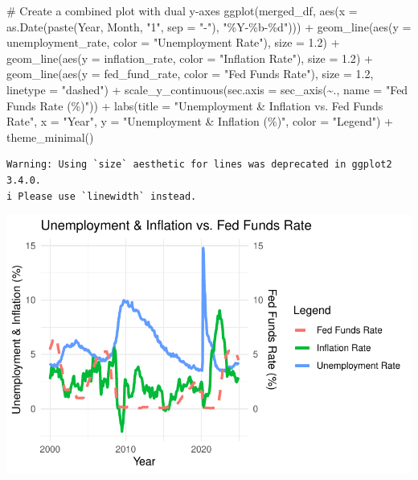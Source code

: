 \documentclass[
  letterpaper,
  DIV=11,
  numbers=noendperiod]{scrartcl}
\newenvironment{Shaded}{\begin{snugshade}}{\end{snugshade}}
\newcommand{\AttributeTok}[1]{\textcolor[rgb]{0.40,0.45,0.13}{#1}}
\newcommand{\CommentTok}[1]{\textcolor[rgb]{0.37,0.37,0.37}{#1}}
\newcommand{\FloatTok}[1]{\textcolor[rgb]{0.68,0.00,0.00}{#1}}
\newcommand{\FunctionTok}[1]{\textcolor[rgb]{0.28,0.35,0.67}{#1}}
\newcommand{\NormalTok}[1]{\textcolor[rgb]{0.00,0.23,0.31}{#1}}
\newcommand{\SpecialCharTok}[1]{\textcolor[rgb]{0.37,0.37,0.37}{#1}}
\newcommand{\StringTok}[1]{\textcolor[rgb]{0.13,0.47,0.30}{#1}}
\begin{document}
\begin{Shaded}
\begin{Highlighting}[]
\CommentTok{\# Create a combined plot with dual y{-}axes}
\FunctionTok{ggplot}\NormalTok{(merged\_df, }\FunctionTok{aes}\NormalTok{(}\AttributeTok{x =} \FunctionTok{as.Date}\NormalTok{(}\FunctionTok{paste}\NormalTok{(Year, Month, }\StringTok{"1"}\NormalTok{, }\AttributeTok{sep =} \StringTok{"{-}"}\NormalTok{), }\StringTok{"\%Y{-}\%b{-}\%d"}\NormalTok{))) }\SpecialCharTok{+}
  \FunctionTok{geom\_line}\NormalTok{(}\FunctionTok{aes}\NormalTok{(}\AttributeTok{y =}\NormalTok{ unemployment\_rate, }\AttributeTok{color =} \StringTok{"Unemployment Rate"}\NormalTok{), }\AttributeTok{size =} \FloatTok{1.2}\NormalTok{) }\SpecialCharTok{+}
  \FunctionTok{geom\_line}\NormalTok{(}\FunctionTok{aes}\NormalTok{(}\AttributeTok{y =}\NormalTok{ inflation\_rate, }\AttributeTok{color =} \StringTok{"Inflation Rate"}\NormalTok{), }\AttributeTok{size =} \FloatTok{1.2}\NormalTok{) }\SpecialCharTok{+}
  \FunctionTok{geom\_line}\NormalTok{(}\FunctionTok{aes}\NormalTok{(}\AttributeTok{y =}\NormalTok{ fed\_fund\_rate, }\AttributeTok{color =} \StringTok{"Fed Funds Rate"}\NormalTok{), }\AttributeTok{size =} \FloatTok{1.2}\NormalTok{, }\AttributeTok{linetype =} \StringTok{"dashed"}\NormalTok{) }\SpecialCharTok{+}
  \FunctionTok{scale\_y\_continuous}\NormalTok{(}\AttributeTok{sec.axis =} \FunctionTok{sec\_axis}\NormalTok{(}\SpecialCharTok{\textasciitilde{}}\NormalTok{., }\AttributeTok{name =} \StringTok{"Fed Funds Rate (\%)"}\NormalTok{)) }\SpecialCharTok{+}
  \FunctionTok{labs}\NormalTok{(}\AttributeTok{title =} \StringTok{"Unemployment \& Inflation vs. Fed Funds Rate"}\NormalTok{,}
       \AttributeTok{x =} \StringTok{"Year"}\NormalTok{, }
       \AttributeTok{y =} \StringTok{"Unemployment \& Inflation (\%)"}\NormalTok{,}
       \AttributeTok{color =} \StringTok{"Legend"}\NormalTok{) }\SpecialCharTok{+}
  \FunctionTok{theme\_minimal}\NormalTok{()}
\end{Highlighting}
\end{Shaded}

\begin{verbatim}
Warning: Using `size` aesthetic for lines was deprecated in ggplot2 3.4.0.
i Please use `linewidth` instead.
\end{verbatim}

\includegraphics{Assignment2_Data608_Quarto_files/figure-pdf/unnamed-chunk-25-1.pdf}
\end{document}
